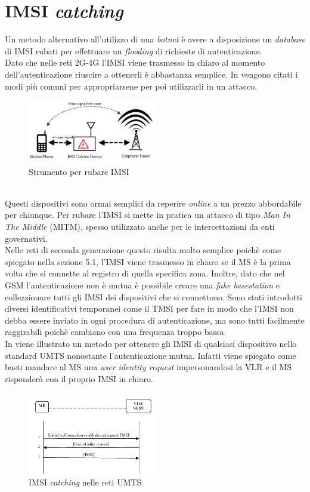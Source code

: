 \section{IMSI \textit{catching}}
Un metodo alternativo all'utilizzo di una \textit{botnet} è avere a disposizione un \textit{database} di IMSI rubati per effettuare un \textit{flooding} di richieste di autenticazione.\\
Dato che nelle reti 2G-4G l'IMSI viene trasmesso in chiaro al momento dell'autenticazione riuscire a ottenerli è abbastanza semplice.
In \cite{imsi-catcher} vengono citati i modi più comuni per appropriarsene per poi utilizzarli in un 
attacco.
\begin{figure}[h]
    \centering
    \includegraphics[width=0.5\textwidth]{images/imsi-catcher.jpg}
    \caption{Strumento per rubare IMSI}
\end{figure}\\
Questi dispositivi sono ormai semplici da reperire \textit{online} a un prezzo abbordabile per chiunque. Per rubare l'IMSI si mette in pratica un attacco di tipo \textit{Man In The Middle} (MITM), spesso utilizzato
anche per le intercettazioni da enti governativi.\\
Nelle reti di seconda generazione questo risulta molto semplice poichè come spiegato nella sezione 5.1, l'IMSI viene trasmesso in chiaro se il MS è la prima volta che si connette al registro di quella specifica
zona. Inoltre, dato che nel GSM l'autenticazione non è mutua è possibile creare una \textit{fake basestation} e collezzionare tutti gli IMSI dei dispositivi che si connettono.
Sono stati introdotti diversi identificativi temporanei come il TMSI per fare in modo che l'IMSI non debba essere inviato in ogni procedura di autenticazione, ma sono tutti facilmente raggirabili poichè cambiano con una
frequenza troppo bassa.\\
In \cite{dos-imsi} viene illustrato un metodo per ottenere gli IMSI di qualsiasi dispositivo nello standard UMTS nonostante l'autenticazione mutua. Infatti viene spiegato come basti mandare al MS una \textit{user identity request} impersonandosi 
la VLR e il MS risponderà con il proprio IMSI in chiaro.
\begin{figure}[h]
    \centering
    \includegraphics[width=0.5\textwidth]{images/imsi-catch-umts.png}
    \caption{IMSI \textit{catching} nelle reti UMTS\cite{dos-imsi}}
\end{figure}\\

